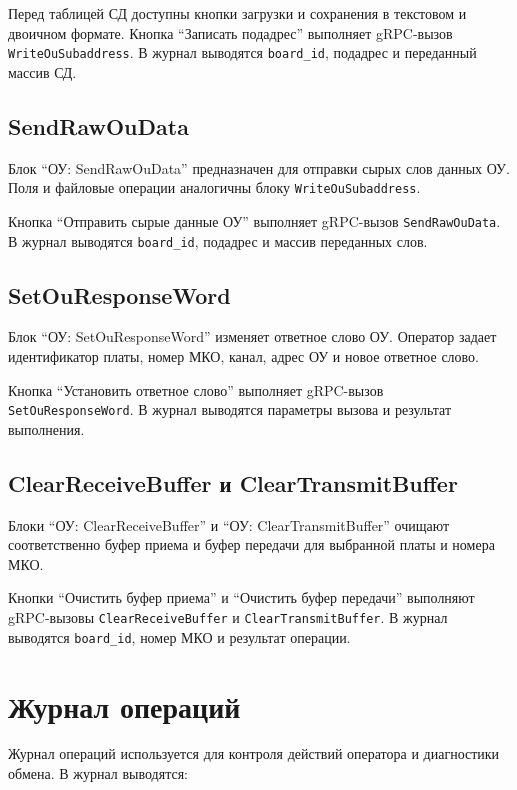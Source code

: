 Перед таблицей СД доступны кнопки загрузки и сохранения в текстовом и двоичном формате. Кнопка ``Записать подадрес'' выполняет gRPC-вызов \texttt{WriteOuSubaddress}. В журнал выводятся \texttt{board\_id}, подадрес и переданный массив СД.

\subsection{SendRawOuData}

Блок ``ОУ: SendRawOuData'' предназначен для отправки сырых слов данных ОУ. Поля и файловые операции аналогичны блоку \texttt{WriteOuSubaddress}.

Кнопка ``Отправить сырые данные ОУ'' выполняет gRPC-вызов \texttt{SendRawOuData}. В журнал выводятся \texttt{board\_id}, подадрес и массив переданных слов.

\subsection{SetOuResponseWord}

Блок ``ОУ: SetOuResponseWord'' изменяет ответное слово ОУ. Оператор задает идентификатор платы, номер МКО, канал, адрес ОУ и новое ответное слово.

Кнопка ``Установить ответное слово'' выполняет gRPC-вызов \texttt{SetOuResponseWord}. В журнал выводятся параметры вызова и результат выполнения.

\subsection{ClearReceiveBuffer и ClearTransmitBuffer}

Блоки ``ОУ: ClearReceiveBuffer'' и ``ОУ: ClearTransmitBuffer'' очищают соответственно буфер приема и буфер передачи для выбранной платы и номера МКО.

Кнопки ``Очистить буфер приема'' и ``Очистить буфер передачи'' выполняют gRPC-вызовы \texttt{ClearReceiveBuffer} и \texttt{ClearTransmitBuffer}. В журнал выводятся \texttt{board\_id}, номер МКО и результат операции.

\section{Журнал операций}

Журнал операций используется для контроля действий оператора и диагностики обмена. В журнал выводятся:

